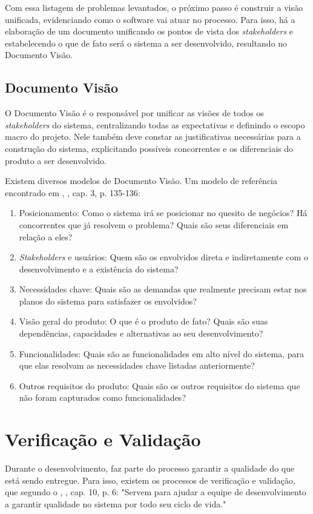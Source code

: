 Com essa listagem de problemas levantados, o próximo passo é construir a visão unificada, evidenciando como o software vai atuar no processo. Para isso, há a elaboração de um documento unificando os pontos de vista dos \textit{stakeholders} e estabelecendo o que de fato será o sistema a ser desenvolvido, resultando no Documento Visão.

\subsection{Documento Visão}
O Documento Visão é o responsável por unificar as visões de todos os \textit{stakeholders} do sistema, centralizando todas as expectativas e definindo o escopo macro do projeto. Nele também deve constar as justificativas necessárias para a construção do sistema, explicitando possíveis concorrentes e os diferenciais do produto a ser desenvolvido.

Existem diversos modelos de Documento Visão. Um modelo de referência encontrado em \citeauthor{kurtbittnerianspence2002}, \citeyear{kurtbittnerianspence2002}, cap. 3, p. 135-136:

\begin{enumerate}
    \item Posicionamento: Como o sistema irá se posicionar no quesito de negócios? Há concorrentes que já resolvem o problema? Quais são seus diferenciais em relação a eles?
    \item \textit{Stakeholders} e usuários: Quem são os envolvidos direta e indiretamente com o desenvolvimento e a existência do sistema?
    \item Necessidades chave: Quais são as demandas que realmente precisam estar nos planos do sistema para satisfazer os envolvidos?
    \item Visão geral do produto: O que é o produto de fato? Quais são suas dependências, capacidades e alternativas ao seu desenvolvimento?
    \item Funcionalidades: Quais são as funcionalidades em alto nível do sistema, para que elas resolvam as necessidades chave listadas anteriormente?
    \item Outros requisitos do produto: Quais são os outros requisitos do sistema que não foram capturados como funcionalidades?
\end{enumerate}

\section{Verificação e Validação}
Durante o desenvolvimento, faz parte do processo garantir a qualidade do que está sendo entregue. Para isso, existem os processos de verificação e validação, que segundo o \citeauthor{ieeecomputersociety2014}, \citeyear{ieeecomputersociety2014}, cap. 10, p. 6: "Servem para ajudar a equipe de desenvolvimento a garantir qualidade no sistema por todo seu ciclo de vida."

